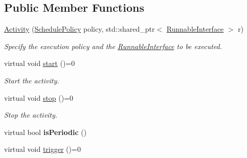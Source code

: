 \subsection*{Public Member Functions}
\begin{DoxyCompactItemize}
\item 
\hypertarget{classcoco_1_1_activity_af87c30a3b206f7f77c832f4e1e2c1d81}{}\hyperlink{classcoco_1_1_activity_af87c30a3b206f7f77c832f4e1e2c1d81}{Activity} (\hyperlink{structcoco_1_1_schedule_policy}{Schedule\+Policy} policy, std\+::shared\+\_\+ptr$<$ \hyperlink{classcoco_1_1_runnable_interface}{Runnable\+Interface} $>$ r)\label{classcoco_1_1_activity_af87c30a3b206f7f77c832f4e1e2c1d81}

\begin{DoxyCompactList}\small\item\em Specify the execution policy and the \hyperlink{classcoco_1_1_runnable_interface}{Runnable\+Interface} to be executed. \end{DoxyCompactList}\item 
\hypertarget{classcoco_1_1_activity_a542dbe1300aa4f03b165dbe4edeb96dd}{}virtual void \hyperlink{classcoco_1_1_activity_a542dbe1300aa4f03b165dbe4edeb96dd}{start} ()=0\label{classcoco_1_1_activity_a542dbe1300aa4f03b165dbe4edeb96dd}

\begin{DoxyCompactList}\small\item\em Start the activity. \end{DoxyCompactList}\item 
\hypertarget{classcoco_1_1_activity_a5c81aa82b5987e3ef5c56affdaefbbaf}{}virtual void \hyperlink{classcoco_1_1_activity_a5c81aa82b5987e3ef5c56affdaefbbaf}{stop} ()=0\label{classcoco_1_1_activity_a5c81aa82b5987e3ef5c56affdaefbbaf}

\begin{DoxyCompactList}\small\item\em Stop the activity. \end{DoxyCompactList}\item 
\hypertarget{classcoco_1_1_activity_a4359a691fe84c7334a6e956cd56b7752}{}virtual bool {\bfseries is\+Periodic} ()\label{classcoco_1_1_activity_a4359a691fe84c7334a6e956cd56b7752}

\item 
\hypertarget{classcoco_1_1_activity_ad270583e0ec466f87df956bd7673f554}{}virtual void \hyperlink{classcoco_1_1_activity_ad270583e0ec466f87df956bd7673f554}{trigger} ()=0\label{classcoco_1_1_activity_ad270583e0ec466f87df956bd7673f554}


\end{DoxyCompactItemize}
